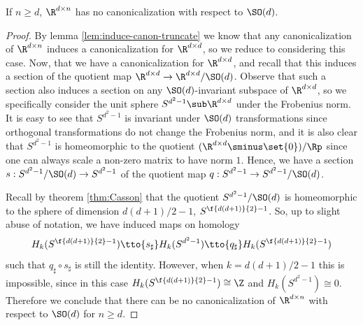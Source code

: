 \begin{theorem}\label{thm:no-SOd-canon-for-dxn}
    If $n \geq d$, $\R^{d \times n}$ has no canonicalization with respect to $\SO(d)$.
    \begin{proof}
        By lemma \ref{lem:induce-canon-truncate} we know that any canonicalization of $\R^{d \times n}$ induces a canonicalization for $\R^{d \times d}$, so we reduce to considering this case.
        Now, \afsoc that we have a canonicalization for $\R^{d \times d}$, and recall that this induces a section  of the quotient map $\R^{d \times d} \to \R^{d \times d}/\SO(d)$.
        Observe that such a section also induces a section on any $\SO(d)$-invariant subspace of $\R^{d \times d}$, so we specifically consider the unit sphere $S^{d^2-1} \sub \R^{d \times d}$ under the Frobenius norm.
        It is easy to see that $S^{d^2-1}$ is invariant under $\SO(d)$ transformations since orthogonal transformations do not change the Frobenius norm, and it is also clear that $S^{d^2-1}$ is homeomorphic to the quotient $(\R^{d \times d} \sminus \set{0}) / \Rp$ since one can always scale a non-zero matrix to have norm $1$.
        Hence, we have a section $s : S^{d^2-1}/\SO(d) \to S^{d^2-1}$ of the quotient map $q : S^{d^2-1} \to S^{d^2-1}/\SO(d)$.

        Recall by theorem \ref{thm:Casson} that the quotient $S^{d^2-1}/\SO(d)$ is homeomorphic to the sphere of dimension $d(d+1)/2-1$, $S^{\f{d(d+1)}{2} - 1}$.
        So, up to slight abuse of notation, we have induced maps on homology
        \[
            H_k(S^{\f{d(d+1)}{2} - 1})
            \tto{s_\sharp}
            H_k(S^{d^2 - 1})
            \tto{q_\sharp}
            H_k(S^{\f{d(d+1)}{2} - 1})
        \]
        such that $q_\sharp \circ s_\sharp$ is still the identity.
        However, when $k = d(d+1)/2-1$ this is impossible, since in this case $H_k(S^{\f{d(d+1)}{2} - 1}) \cong \Z$ and $H_k(S^{d^2-1}) \cong 0$.
        Therefore we conclude that there can be no canonicalization of $\R^{d \times n}$ with respect to $\SO(d)$ for $n \geq d$.
    \end{proof}
\end{theorem}

